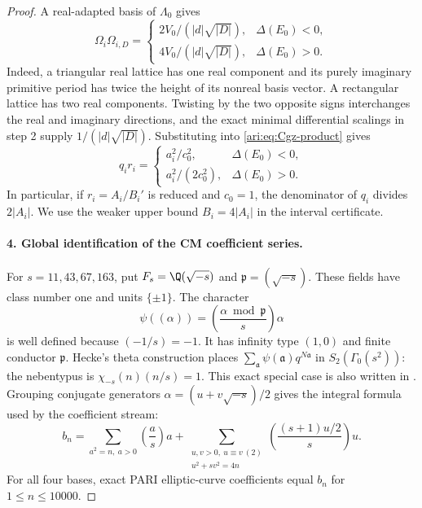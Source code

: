 \begin{proof}
A real-adapted basis of $\Lambda_0$ gives
\[
 \Omega_i\Omega_{i,D}=
 \begin{cases}
 2V_0/(|d|\sqrt{|D|}),&\Delta(E_0)<0,\\
 4V_0/(|d|\sqrt{|D|}),&\Delta(E_0)>0.
 \end{cases}
\]
Indeed, a triangular real lattice has one real component and its
purely imaginary primitive period has twice the height of its
nonreal basis vector. A rectangular lattice has two real
components. Twisting by the two opposite signs interchanges the
real and imaginary directions, and the exact minimal differential
scalings in step 2 supply $1/(|d|\sqrt{|D|})$.
Substituting into \eqref{ari:eq:Cgz-product} gives
\begin{equation}\label{ari:eq:Cgz-denominator}
 q_ir_i=
 \begin{cases}
 a_i^2/c_0^2,&\Delta(E_0)<0,\\
 a_i^2/(2c_0^2),&\Delta(E_0)>0.
 \end{cases}
\end{equation}
In particular, if $r_i=A_i/B_i'$ is reduced and $c_0=1$, the
denominator of $q_i$ divides $2|A_i|$. We use the weaker upper
bound $B_i=4|A_i|$ in the interval certificate.

\paragraph{4. Global identification of the CM coefficient series.}
For $s=11,43,67,163$, put
$F_s=\Q(\sqrt{-s})$ and $\mathfrak p=(\sqrt{-s})$.
These fields have class number one and units $\{\pm1\}$.
The character
\[
 \psi((\alpha))=
  \left(\frac{\alpha\bmod\mathfrak p}{s}\right)\alpha
\]
is well defined because $(-1/s)=-1$. It has infinity type $(1,0)$
and finite conductor $\mathfrak p$. Hecke's theta construction
places $\sum_{\mathfrak a}\psi(\mathfrak a)q^{N\mathfrak a}$ in
$S_2(\Gamma_0(s^2))$: the nebentypus is
$\chi_{-s}(n)(n/s)=1$. This exact special case is also written
in \citet[\S3, pp.~4--5]{CrDarmon2009}. Grouping conjugate
generators $\alpha=(u+v\sqrt{-s})/2$ gives the integral formula
used by the coefficient stream:
\[
 b_n=\sum_{a^2=n,\ a>0}\left(\frac as\right)a
  +\sum_{\substack{u,v>0,\ u\equiv v\ (2)\\u^2+sv^2=4n}}
       \left(\frac{(s+1)u/2}{s}\right)u.
\]
For all four bases, exact PARI elliptic-curve coefficients equal
$b_n$ for $1\leq n\leq10000$.


\end{proof}
